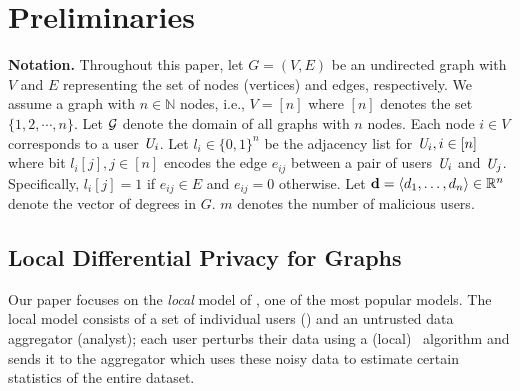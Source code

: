 \section{Preliminaries}\label{sec:background}
\textbf{Notation.}
Throughout this paper, let $G = (V, E)$ be an undirected 
graph with $V$ and $E$ representing the set of nodes (vertices) and edges, respectively. We assume a graph with $n \in \mathbb{N}$ nodes, i.e., $V = [n]$ where $[n]$ denotes the set $\{1,2,\cdots,n\}$. Let $\mathcal{G}$ denote the domain of all graphs with $n$ nodes. Each node $i \in V$ corresponds to a user $\textit{U}_i$. Let $l_i \in \{0,1\}^n$ be the adjacency list for $\textit{U}_i, i \in [n]$ where bit $l_i[j], j \in [n]$ encodes the edge $e_{ij}$ between a pair of users $\textit{U}_i$ and $\textit{U}_j$. Specifically, $l_i[j]=1$ if $e_{ij}\in E$ and $e_{ij}=0$ otherwise. %
Let $\textbf{d}=\langle d_1, \ldots, d_n\rangle \in \mathbb{R}^n$ denote the vector of degrees in $G$. $m$ denotes the number of malicious users.


\subsection{Local Differential Privacy for Graphs}\label{sec:ldp}
Our paper focuses on the \textit{local} model of \DP, one of the most popular models. %
The local model consists of a set of individual users (\DO) and an untrusted data aggregator (analyst); each user perturbs their data using a (local) \DP~algorithm and sends it to the aggregator which uses these noisy data to estimate certain statistics of the entire dataset. %
 
